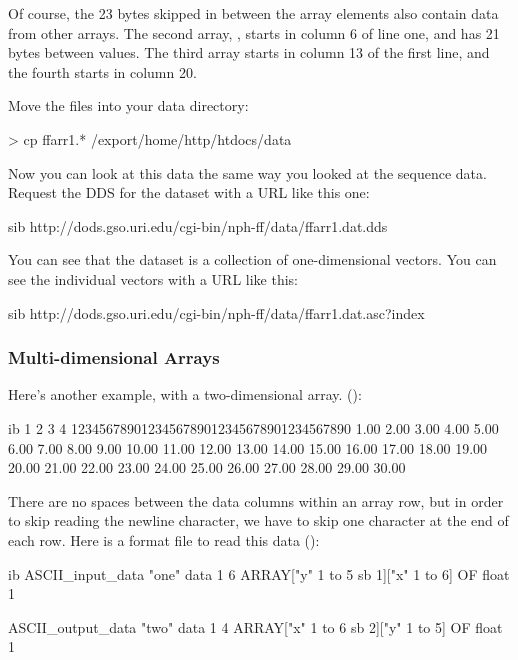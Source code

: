 Of course, the 23 bytes skipped in between the  array
elements also contain data from other arrays.  The second array,
, starts in column 6 of line one, and has 21 bytes between
values.  The third array starts in column 13 of the first line, and
the fourth starts in column 20.

Move the  files into your data directory:

\begin{example}
> cp ffarr1.* /export/home/http/htdocs/data
\end{example}

Now you can look at this data the same way you looked at the sequence
data.  Request the DDS for the dataset with a URL like this one:

\begin{vcode}{sib}
http://dods.gso.uri.edu/cgi-bin/nph-ff/data/ffarr1.dat.dds
\end{vcode}

You can see that the dataset is a collection of one-dimensional
vectors.  You can see the individual vectors with a URL like this:

\begin{vcode}{sib}
http://dods.gso.uri.edu/cgi-bin/nph-ff/data/ffarr1.dat.asc?index
\end{vcode}

\subsubsection{Multi-dimensional Arrays}

Here's another example, with a two-dimensional array.
():

\begin{vcode}{ib}
         1         2         3         4
1234567890123456789012345678901234567890
  1.00  2.00  3.00  4.00  5.00  6.00
  7.00  8.00  9.00 10.00 11.00 12.00
 13.00 14.00 15.00 16.00 17.00 18.00
 19.00 20.00 21.00 22.00 23.00 24.00
 25.00 26.00 27.00 28.00 29.00 30.00
\end{vcode}

There are no spaces between the data columns within an array row, but in
order to skip reading the newline character, we have to skip one
character at the end of each row.  Here is a format file to read this
data ():

\begin{vcode}{ib}
ASCII_input_data "one"
data 1 6 ARRAY["y" 1 to 5 sb 1]["x" 1 to 6] OF float 1

ASCII_output_data "two"
data 1 4 ARRAY["x" 1 to 6 sb 2]["y" 1 to 5] OF float 1
\end{vcode}

